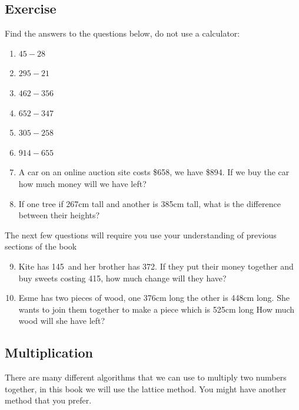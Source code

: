 \subsection{Exercise}
Find the answers to the questions below, do not use a calculator:
\begin{multicols}{2}
\begin{enumerate}
  \item $45 - 28$
  \item $295 - 21$
  \item $462 - 356$
  \item $652 - 347$
  \item $305 - 258$
  \item $914 - 655$
  \item A car on an online auction site costs \$658, we have \$894.  If we buy the car how much money will we have left?
  \item If one tree if 267cm tall and another is 385cm tall, what is the difference between their heights?
\end{enumerate}
\end{multicols}
\noindent The next few questions will require you use your understanding of previous sections of the book
\begin{enumerate}
	\setcounter{enumi}{8}
	\item Kite has 145\cent  \ and her brother has 372\cent.  If they put their money together and buy sweets costing 415\cent, how much change will they have?
	\item Esme has two pieces of wood, one 376cm long the other is 448cm long.  She wants to join them together to make a piece which is 525cm long  How much wood will she have left?
\end{enumerate}

\subsection{Multiplication}
There are many different algorithms that we can use to multiply two numbers together, in this book we will use the lattice method.  You might have another method that you prefer.

